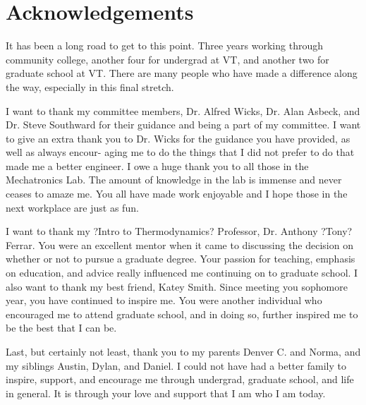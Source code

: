 \begin{sloppypar}
\section{Acknowledgements}

It has been a long road to get to this point. Three years working through community college, another four for undergrad at VT, and another two for graduate school at VT. There are many people who have made a difference along the way, especially in this final stretch.

I want to thank my committee members, Dr. Alfred Wicks, Dr. Alan Asbeck, and Dr. Steve Southward for their guidance and being a part of my committee. I want to give an extra thank you to Dr. Wicks for the guidance you have provided, as well as always encour- aging me to do the things that I did not prefer to do that made me a better engineer. I owe a huge thank you to all those in the Mechatronics Lab. The amount of knowledge in the lab is immense and never ceases to amaze me. You all have made work enjoyable and I hope those in the next workplace are just as fun.

I want to thank my ?Intro to Thermodynamics? Professor, Dr. Anthony ?Tony? Ferrar. You were an excellent mentor when it came to discussing the decision on whether or not to pursue a graduate degree. Your passion for teaching, emphasis on education, and advice really influenced me continuing on to graduate school. I also want to thank my best friend, Katey Smith. Since meeting you sophomore year, you have continued to inspire me. You were another individual who encouraged me to attend graduate school, and in doing so, further inspired me to be the best that I can be.

Last, but certainly not least, thank you to my parents Denver C. and Norma, and my siblings Austin, Dylan, and Daniel. I could not have had a better family to inspire, support, and encourage me through undergrad, graduate school, and life in general. It is through your love and support that I am who I am today.

\end{sloppypar}